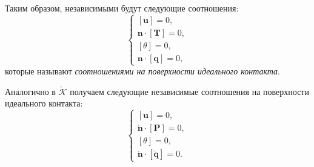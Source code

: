 Таким образом, независимыми будут следующие соотношения:
\begin{equation}
	\begin{cases}
		[\mathbf{u}] = 0, \\
		\mathbf{n} \cdot [\mathbf{T}] = 0, \\
		[\theta] = 0, \\
		\mathbf{n} \cdot [\mathbf{q}] = 0,
	\end{cases}
\end{equation}
которые называют \textit{соотношениями на поверхности идеального контакта}.

Аналогично в $\mathring{\mathcal{K}}$ получаем следующие независимые соотношения на поверхности идеального контакта:
\begin{equation*}
	\begin{cases}
		[\mathbf{u}] = 0, \\
		\mathring{\mathbf{n}} \cdot [\mathbf{P}] = 0, \\
		[\theta] = 0, \\
		\mathring{\mathbf{n}} \cdot [\mathring{\mathbf{q}}] = 0.
	\end{cases}
\end{equation*}